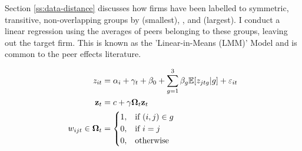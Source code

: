Section \ref{ss:data-distance} discusses how firms have been labelled to symmetric, transitive,
non-overlapping groups by  (smallest), , and  (largest).
I conduct a linear regression using the averages of peers belonging to these groups,
leaving out the target firm. This is known as the 'Linear-in-Means (LMM)' Model
and is common to the peer effects literature.

\begin{align}
    \label{eq:lmm-structural1}
    z_{it} &= \alpha_i + \gamma_t + \beta_0
                + \sum_{g=1}^3 \beta_g \mathbb E[z_{jtg}\vert{}g]
                + \varepsilon_{it}
    \\
    \notag
    \mathbf z_t &= c + \gamma \mathbf \Omega_t \mathbf z_t
    \\
    w_{ijt}\in \mathbf \Omega_t &=
        \begin{cases}
            1, & \text{if} \ (i,j)\in g   \\
            0, & \text{if} \ i=j         \\
            0, & \text{otherwise}
        \end{cases}
\end{align}


